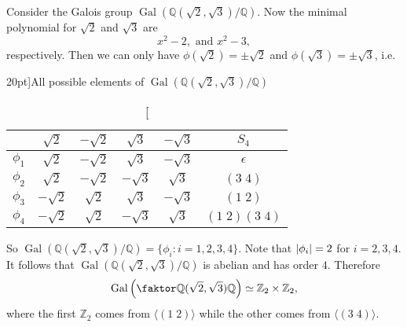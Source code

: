 \documentclass[notoc,notitlepage,nobib]{tufte-book}
\DeclareMathOperator{\Gal}{Gal}
\begin{document}
\begin{eg}
  Consider the Galois group $\Gal( \mathbb{Q}(\sqrt{2}, \sqrt{3}) / \mathbb{Q}
  )$. Now the minimal polynomial for $\sqrt{2}$ and $\sqrt{3}$ are
  \begin{equation*}
    x^2 - 2, \text{ and } x^2 - 3,
  \end{equation*}
  respectively. Then we can only have $\phi(\sqrt{2}) = \pm \sqrt{2}$ and
  $\phi(\sqrt{3}) = \pm \sqrt{3}$, i.e.
  \begin{table}[ht]
    \centering
    \caption[][20pt]{All possible elements of $\Gal(\mathbb{Q}(\sqrt{2}, \sqrt{3}) /
    \mathbb{Q})$}
    \label{table:all_possible_elements_of_gal_q_sqrt_2_sqrt_3_q}
    \begin{tabular}{c | c c c c | c}
               & $\sqrt{2}$ & $-\sqrt{2}$ & $\sqrt{3}$ & $-\sqrt{3}$ & $S_4$ \\
       \hline
      $\phi_1$ & $\sqrt{2}$ & $-\sqrt{2}$ & $\sqrt{3}$ & $-\sqrt{3}$ & $\epsilon$ \\
      $\phi_2$ & $\sqrt{2}$ & $-\sqrt{2}$ & $-\sqrt{3}$ & $\sqrt{3}$ & $(3 \; 4)$ \\
      $\phi_3$ & $-\sqrt{2}$ & $\sqrt{2}$ & $\sqrt{3}$ & $-\sqrt{3}$ & $(1 \; 2)$ \\
      $\phi_4$ & $-\sqrt{2}$ & $\sqrt{2}$ & $-\sqrt{3}$ & $\sqrt{3}$ & $(1 \; 2)(3 \; 4)$
    \end{tabular}
  \end{table}
  So $\Gal( \mathbb{Q}(\sqrt{2}, \sqrt{3}) / \mathbb{Q} ) = \{ \phi_i : i = 1,
  2, 3, 4 \}$. Note that $\left|\phi_i\right| = 2$ for $i = 2, 3, 4$. It follows that
  $\Gal( \mathbb{Q}(\sqrt{2}, \sqrt{3}) / \mathbb{Q} )$ is abelian and has order
  $4$. Therefore
  \begin{equation*}
    \Gal \left( \quotient{\mathbb{Q}(\sqrt{2}, \sqrt{3})}{\mathbb{Q}} \right)
    \simeq \mathbb{Z}_2 \times \mathbb{Z}_2,
  \end{equation*}
  where the first $\mathbb{Z}_2$ comes from $\langle (1 \; 2) \rangle$ while the
  other comes from $\langle (3 \; 4) \rangle$.
\end{eg}
\end{document}
